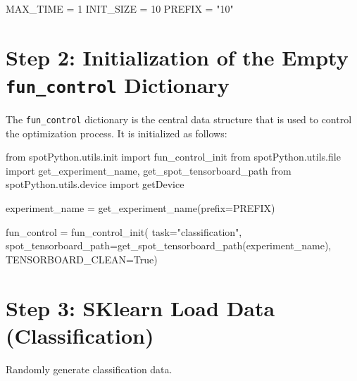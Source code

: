 \documentclass[
  letterpaper,
  DIV=11,
  numbers=noendperiod]{scrreprt}
\newenvironment{Shaded}{\begin{snugshade}}{\end{snugshade}}
\newcommand{\BuiltInTok}[1]{\textcolor[rgb]{0.00,0.23,0.31}{#1}}
\newcommand{\DecValTok}[1]{\textcolor[rgb]{0.68,0.00,0.00}{#1}}
\newcommand{\ImportTok}[1]{\textcolor[rgb]{0.00,0.46,0.62}{#1}}
\newcommand{\NormalTok}[1]{\textcolor[rgb]{0.00,0.23,0.31}{#1}}
\newcommand{\OperatorTok}[1]{\textcolor[rgb]{0.37,0.37,0.37}{#1}}
\newcommand{\StringTok}[1]{\textcolor[rgb]{0.13,0.47,0.30}{#1}}
\newcommand{\VariableTok}[1]{\textcolor[rgb]{0.07,0.07,0.07}{#1}}
\begin{document}
\begin{Shaded}
\begin{Highlighting}[]
\NormalTok{MAX\_TIME }\OperatorTok{=} \DecValTok{1}
\NormalTok{INIT\_SIZE }\OperatorTok{=} \DecValTok{10}
\NormalTok{PREFIX }\OperatorTok{=} \StringTok{"10"}
\end{Highlighting}
\end{Shaded}

\hypertarget{step-2-initialization-of-the-empty-fun_control-dictionary}{%
\section{\texorpdfstring{Step 2: Initialization of the Empty
\texttt{fun\_control}
Dictionary}{Step 2: Initialization of the Empty fun\_control Dictionary}}\label{step-2-initialization-of-the-empty-fun_control-dictionary}}

The \texttt{fun\_control} dictionary is the central data structure that
is used to control the optimization process. It is initialized as
follows:

\begin{Shaded}
\begin{Highlighting}[]
\ImportTok{from}\NormalTok{ spotPython.utils.init }\ImportTok{import}\NormalTok{ fun\_control\_init}
\ImportTok{from}\NormalTok{ spotPython.utils.}\BuiltInTok{file} \ImportTok{import}\NormalTok{ get\_experiment\_name, get\_spot\_tensorboard\_path}
\ImportTok{from}\NormalTok{ spotPython.utils.device }\ImportTok{import}\NormalTok{ getDevice}

\NormalTok{experiment\_name }\OperatorTok{=}\NormalTok{ get\_experiment\_name(prefix}\OperatorTok{=}\NormalTok{PREFIX)}

\NormalTok{fun\_control }\OperatorTok{=}\NormalTok{ fun\_control\_init(}
\NormalTok{    task}\OperatorTok{=}\StringTok{"classification"}\NormalTok{,}
\NormalTok{    spot\_tensorboard\_path}\OperatorTok{=}\NormalTok{get\_spot\_tensorboard\_path(experiment\_name),}
\NormalTok{    TENSORBOARD\_CLEAN}\OperatorTok{=}\VariableTok{True}\NormalTok{)}
\end{Highlighting}
\end{Shaded}

\hypertarget{sec-data-loading-10}{%
\section{Step 3: SKlearn Load Data
(Classification)}\label{sec-data-loading-10}}

Randomly generate classification data.
\end{document}
